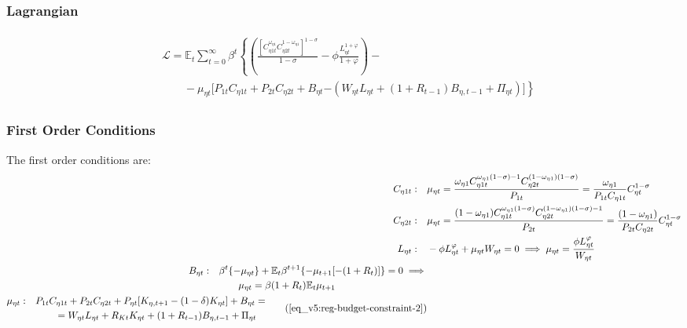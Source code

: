 \documentclass[../thesis.tex]{subfiles}
\begin{document}
\subsubsection*{Lagrangian}

\begin{align}
	\begin{split}
	& \mathcal{L} = \mathbb{E}_t \sum_{t=0}^{\infty} \beta^t \left\{ \left( \frac{ \left[ C_{\eta 1 t}^{\omega_{\eta 1}} C_{\eta 2 t}^{1-\omega_{\eta 1}} \right]^{1 -\sigma}}{1 -\sigma} - \phi \frac{L_{\eta t}^{1+\varphi}}{1+\varphi} \right) \right. - 
	\\ & \qquad - \mu_{\eta t} \Big[ P_{1 t} C_{\eta 1 t} + P_{2 t} C_{\eta 2 t} + B_{\eta t} \left. - ( W_{\eta t} L_{\eta t} + (1 + R_{t-1}) B_{\eta,t-1} + \Pi_{\eta t} ) \Big] \right\} \label{eq_v5:reg-household-lagrangian}
	\end{split}
\end{align}

\subsubsection*{First Order Conditions}

The first order conditions are:
\begin{align}
	C_{\eta 1 t}: \quad & \mu_{\eta t} = \frac{\omega_{\eta 1} C_{\eta 1 t}^{\omega_{\eta 1} (1 -\sigma) -1} C_{\eta 2 t}^{(1 -\omega_{\eta 1})(1 -\sigma)}}{P_{1 t}} = \frac{\omega_{\eta 1}}{P_{1 t} C_{\eta 1 t}} C_{\eta t}^{1 -\sigma} \label{eq_v5:reg-FOC-C1-eta-t} 
	\\
	C_{\eta 2 t}: \quad & \mu_{\eta t} = \frac{(1 -\omega_{\eta 1}) C_{\eta 1 t}^{\omega_{\eta 1} (1 -\sigma)} C_{\eta 2 t}^{(1 -\omega_{\eta 1})(1 -\sigma)-1}}{P_{2 t}} = \frac{(1 -\omega_{\eta 1})}{P_{2 t} C_{\eta 2 t}} C_{\eta t}^{1 -\sigma} \label{eq_v5:reg-FOC-C-2-eta-t} 
	\\
	L_{\eta t}: \quad & -\phi L_{\eta t}^{\varphi} +\mu_{\eta t} W_{\eta t} = 0 \implies \mu_{\eta t} = \frac{\phi L_{\eta t}^{\varphi}}{W_{\eta t}} \label{eq_v5:reg-household-FOC-Lt} 
	\\
	\begin{split}
		B_{\eta t}: \quad & \beta^t \{-\mu_{\eta t}\} + \E \beta^{t+1} \{ -\mu_{t+1} [-(1 + R_{t})] \} = 0 \implies \\ & \qquad \mu_{\eta t} = \beta (1 + R_{t}) \E{ \mu_{t+1}}
	\end{split} \label{eq_v5:reg-FOC-Bt}
	\\
	\begin{split}
		\mu_{\eta t}: \quad & P_{1 t} C_{\eta 1 t} + P_{2 t} C_{\eta 2 t} + P_{\eta t} [ K_{\eta, t+1} - (1-\delta)K_{\eta t} ] + B_{\eta t} = \\ & \qquad = W_{\eta t} L_{\eta t} + R_{Kt} K_{\eta t} + (1 + R_{t-1}) B_{\eta,t-1} + \Pi_{\eta t}
	\end{split} \tag{\ref{eq_v5:reg-budget-constraint-2}}
\end{align}
\end{document}
